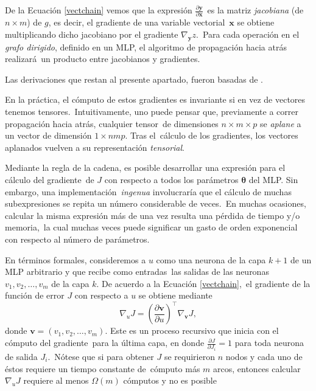 De la Ecuación \ref{vectchain} vemos que la expresión $\frac{\partial \mathbf{y}}{\partial \mathbf{x}}$\
es la matriz \emph{jacobiana} (de $n \times m$) de $g$, es decir, el gradiente de una variable vectorial\
$\mathbf{x}$ se obtiene multiplicando dicho jacobiano por el gradiente $\nabla_{\mathbf{y}} z$.\
Para cada operación en el \emph{grafo dirigido}, definido en un MLP, el algoritmo de propagación hacia atrás realizará\
un producto entre jacobianos y gradientes.\par
Las derivaciones que restan al presente apartado, fueron basadas de \cite{website:umontreal:deeplearning}.\par
En la práctica, el cómputo de estos gradientes es invariante si en vez de vectores tenemos tensores.\
Intuitivamente, uno puede pensar que, previamente a correr propagación hacia atrás, cualquier tensor\
de dimensiones $n \times m \times p$ se \emph{aplane} a un vector de dimensión $1 \times nmp$. Tras el\
cálculo de los gradientes, los vectores aplanados vuelven a su representación \emph{tensorial}.\par
Mediante la regla de la cadena, es posible desarrollar una expresión para el cálculo del gradiente\
de $J$ con respecto a todos los parámetros $\bm{\theta}$ del MLP. Sin embargo, una implementación\
\emph{ingenua} involucraría que el cálculo de muchas subexpresiones se repita un número considerable de veces.\
En muchas ocasiones, calcular la misma expresión más de una vez resulta una pérdida de tiempo y/o memoria,\
la cual muchas veces puede significar un gasto de orden exponencial con respecto al número de parámetros.\par
En términos formales, consideremos a $u$ como una neurona de la capa $k+1$ de un MLP arbitrario y que recibe como entradas\
las salidas de las neuronas $v_1, v_2, \ldots, v_m$ de la capa $k$. De acuerdo a la Ecuación \ref{vectchain},\
el gradiente de la función de error $J$ con respecto a $u$ se obtiene mediante
\begin{equation}
  \nabla_{u} J =
  \left(\frac{\partial \bm{v}}{\partial u}\right)^\top \nabla_{\bm{v}} J, \label{neurongradient}
\end{equation}
donde $\bm{v} = (v_1, v_2, \ldots, v_m)$. Este es un proceso recursivo que inicia con el cómputo del gradiente\
para la última capa, en donde $\frac{\partial J}{\partial J_i} = 1$ para toda neurona de salida $J_i$.\
Nótese que si para obtener $J$ se requirieron $n$ nodos y cada uno de éstos requiere un tiempo constante de\
cómputo más $m$ arcos, entonces calcular $\nabla_{u} J$ requiere al menos $\Omega(m)$ cómputos y no es posible\

